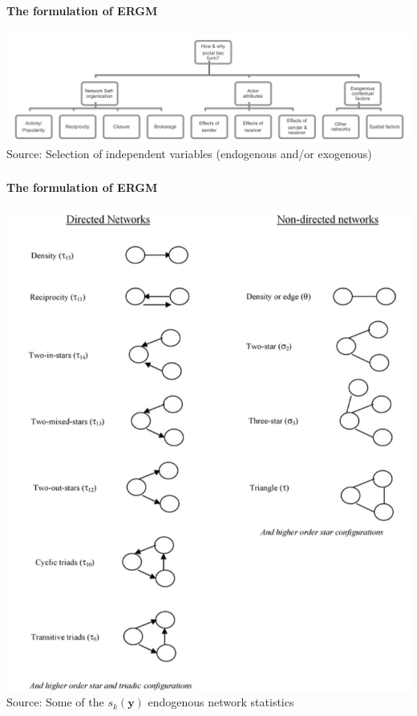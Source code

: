 \documentclass[8pt]{beamer}
\begin{document}

\begin{frame}
\frametitle{\insertsection}
\framesubtitle{The formulation of ERGM}

\centering
\includegraphics[width= \textwidth]{ergm_framework}\\
\tiny{Source: Selection of independent variables (endogenous and/or exogenous) \cite{Amati2018}}

\end{frame}


\begin{frame}
\frametitle{\insertsection}
\framesubtitle{The formulation of ERGM}

\centering
\includegraphics[height=0.8\textheight]{ergm_terms}\\
\tiny{Source: Some of the $s_k(\mathbf{y})$ endogenous network statistics \cite{Robins2007}}

\end{frame}
\end{document}
